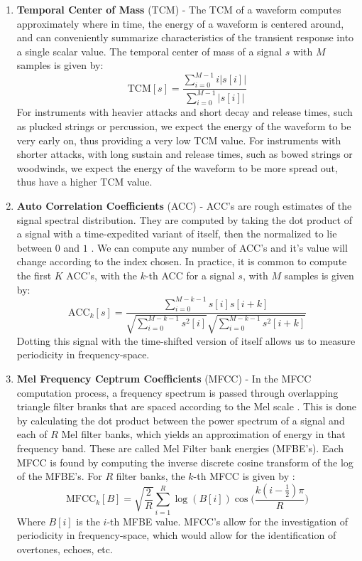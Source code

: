 \documentclass[conference,twocolumn,letterpaper]{IEEEtran}
\begin{document}
\begin{enumerate}
\item\textbf{Temporal Center of Mass} (TCM) - 
The TCM of a waveform computes approximately where in time, the energy of a waveform is centered around, and can conveniently summarize characteristics of the transient response into a single scalar value. The temporal center of mass of a signal $s$ with $M$ samples is given by:
\begin{equation}
    \label{eqn:TCM}
    \text{TCM}[s] = \frac{\sum_{i=0}^{M-1}i\big|s[i]\big|}{\sum_{i=0}^{M-1}\big|s[i]\big|}
\end{equation}
For instruments with heavier attacks and short decay and release times, such as plucked strings or percussion, we expect the energy of the waveform to be very early on, thus providing a very low TCM value. For instruments with shorter attacks, with long sustain and release times, such as bowed strings or woodwinds, we expect the energy of the waveform to be more spread out, thus have a higher TCM value.

\item\textbf{Auto Correlation Coefficients} (ACC) -
ACC's are rough estimates of the signal spectral distribution. They are computed by taking the dot product of a signal with a time-expedited variant of itself, then the normalized to lie between $0$ and $1$ \cite{Virtanen}. We can compute any number of ACC's and it's value will change according to the index chosen. In practice, it is common to compute the first $K$ ACC's, with the $k$-th ACC for a signal $s$, with $M$ samples is given by:
\begin{equation}
    \label{eqn:ACC}
    \text{ACC}_k[s] = \frac{\sum_{i=0}^{M-k-1}s[i]s[i+k]}{\sqrt{\sum_{i=0}^{M-k-1}s^2[i]}\sqrt{\sum_{i=0}^{M-k-1}s^2[i+k]}}
\end{equation}
Dotting this signal with the time-shifted version of itself allows us to measure periodicity in frequency-space. 

\item\textbf{Mel Frequency Ceptrum Coefficients} (MFCC) - 
In the MFCC computation process, a frequency spectrum is passed through overlapping triangle filter branks that are spaced according to the Mel scale \cite{Sahidullah}. This is done by calculating the dot product between the power spectrum of a signal and each of $R$ Mel filter banks, which yields an approximation of energy in that frequency band. These are called Mel Filter bank energies (MFBE's). Each MFCC is found by computing the inverse discrete cosine transform of the log of the MFBE's. For $R$ filter banks, the $k$-th MFCC is given by \cite{Virtanen}:
\begin{equation}
    \label{eqn:MFCC}
    \text{MFCC}_k[B] = \sqrt{\frac{2}{R}}\sum_{i=1}^{R}\log{(B[i])}
    \cos\Big(\frac{k(i-\frac{1}{2})\pi}{R}\Big)
\end{equation}
Where $B[i]$ is the $i$-th MFBE value. MFCC's allow for the investigation of periodicity in frequency-space, which would allow for the identification of overtones, echoes, etc. 


\end{enumerate}
\end{document}

